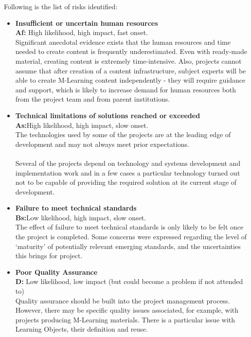 \documentclass[openany,12pt]{report}
\begin{document}
\hspace*{0.5in} Following is the list of risks identified:
\begin{itemize}
\item{\textbf{Insufficient or uncertain human resources }\\
\textbf{Af:} High likelihood, high impact, fast onset. \\
Significant anecdotal evidence exists that the human resources and time needed to create content is frequently underestimated. Even with ready-made material, creating content is extremely time-intensive. Also, projects cannot assume that after creation of a content infrastructure, subject experts will be able to create M-Learning content independently - they will require guidance and support, which is likely to increase demand for human resources both from the project team and from parent institutions.}
\item{\textbf{Technical limitations of solutions reached or exceeded}\\
 \textbf{As:}High likelihood, high impact, slow onset.\\
The technologies used by some of the projects are at the leading edge of development and may not always meet prior expectations.\\
\\
\hspace*{0.5in}Several of the projects depend on technology and systems development and implementation work and in a few cases a particular technology turned out not to be capable of providing the required solution at its current stage of development.}
\item{\textbf{Failure to meet technical standards}\\
 \textbf{Bs:}Low likelihood, high impact, slow onset.\\
The effect of failure to meet technical standards is only likely to be felt once the project is completed. Some concerns were expressed regarding the level of ‘maturity’ of potentially relevant emerging standards, and the uncertainties this brings for project.}
\item{\textbf{Poor Quality Assurance}\\
\textbf{D:} Low likelihood, low impact (but could become a problem if not attended to)\\
Quality assurance should be built into the project management process. However, there may be specific quality issues associated, for example, with projects producing M-Learning materials. There is a particular issue with Learning Objects, their definition and reuse.}
\end{itemize}
\end{document}

